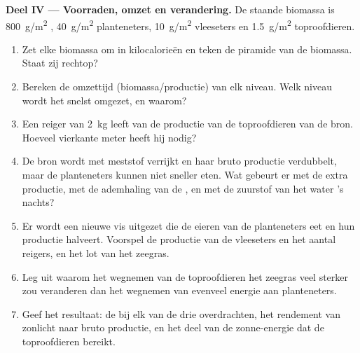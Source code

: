 \begin{problem}
\medskip
\noindent\textbf{Deel IV --- Voorraden, omzet en verandering.}
De staande biomassa is \qty{800}{g/m^2} , \qty{40}{g/m^2}
planteneters, \qty{10}{g/m^2} vleeseters en \qty{1.5}{g/m^2}
toproofdieren.
\begin{enumerate}[resume]
  \item Zet elke biomassa om in kilocalorieën en teken de piramide van de
        biomassa. Staat zij rechtop?
  \item Bereken de omzettijd (biomassa/productie) van elk niveau. Welk
        niveau wordt het snelst omgezet, en waarom?
  \item Een reiger van \qty{2}{kg} leeft van de productie van de
        toproofdieren van de bron. Hoeveel vierkante meter heeft hij
        nodig?
  \item De bron wordt met meststof verrijkt en haar bruto productie
        verdubbelt, maar de planteneters kunnen niet sneller eten. Wat
        gebeurt er met de extra productie, met de ademhaling van de
        , en met de zuurstof van het water 's nachts?
  \item Er wordt een nieuwe vis uitgezet die de eieren van de planteneters
        eet en hun productie halveert. Voorspel de productie van de
        vleeseters en het aantal reigers, en het lot van het zeegras.
  \item Leg uit waarom het wegnemen van de toproofdieren het zeegras veel
        sterker zou veranderen dan het wegnemen van evenveel energie aan
        planteneters.
  \item Geef het resultaat: de  bij elk van de drie
        overdrachten, het rendement van zonlicht naar bruto productie, en
        het deel van de zonne-energie dat de toproofdieren bereikt.
\end{enumerate}
\end{problem}

